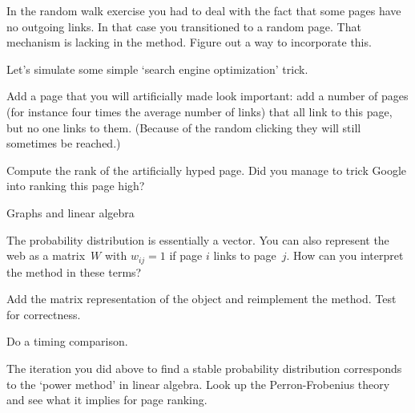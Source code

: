\begin{exercise}
  In the random walk exercise you had to deal with the fact that some
  pages have no outgoing links. In that case you transitioned to a
  random page. That mechanism is lacking in the 
  method. Figure out a way to incorporate this.
\end{exercise}

Let's simulate some simple `search engine optimization' trick.

\begin{exercise}
  Add a page that you will artificially made look important: add a
  number of pages (for instance four times the average number of
  links) that all link to this page, but no one links to
  them. (Because of the random clicking they will still sometimes be
  reached.)

  Compute the rank of the artificially hyped page.
  Did you manage to trick Google into ranking this page high?
\end{exercise}

 {Graphs and linear algebra}

The probability distribution is essentially a vector. You can also
represent the web as a matrix~$W$ with $w_{ij}=1$ if page $i$
links to page~$j$. How can you interpret the  method in
these terms?

\begin{exercise}
  Add the matrix representation of the  object and reimplement
  the  method. Test for correctness.

  Do a timing comparison.
\end{exercise}

The iteration you did above to find a stable probability distribution
corresponds to the `power method' in linear algebra. Look up the
Perron-Frobenius theory and see what it implies for page ranking.

